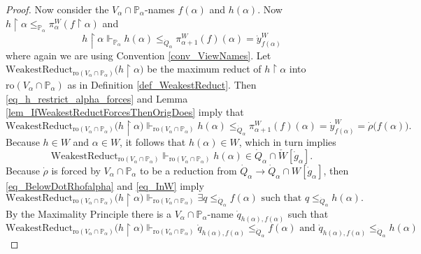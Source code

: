 \documentclass{amsart}
\begin{document}
\begin{proof}
Now consider the $V_\alpha \cap \mathbb{P}_\alpha$-names $f(\alpha)$ and $h(\alpha)$.  Now $h \restriction \alpha \le_{\mathbb{P}_\alpha} \pi^W_\alpha(f \restriction \alpha)$ and 
\begin{equation}\label{eq_h_restrict_alpha_forces}
h \restriction \alpha \Vdash_{\mathbb{P}_\alpha} h(\alpha) \le_{\dot{Q}_\alpha} \pi^W_{\alpha+1} (f)  (\alpha) = \dot{y}^W_{f(\alpha)}
\end{equation}
where again we are using Convention \ref{conv_ViewNames}.  Let $\text{WeakestReduct}_{\text{ro}(V_\alpha \cap \mathbb{P}_\alpha)} \big( h \restriction \alpha \big)$ be the maximum reduct of $h \restriction \alpha$ into $\text{ro}(V_\alpha \cap \mathbb{P}_\alpha)$ as in Definition \ref{def_WeakestReduct}.  Then \eqref{eq_h_restrict_alpha_forces} and Lemma \ref{lem_IfWeakestReductForcesThenOrigDoes} imply that
\begin{equation}\label{eq_BelowDotRhofalpha}
\text{WeakestReduct}_{\text{ro}(V_\alpha \cap \mathbb{P}_\alpha)} \big( h \restriction \alpha \big) \Vdash_{\text{ro}(V_\alpha \cap \mathbb{P}_\alpha)} h(\alpha) \le_{\dot{Q}_\alpha} \pi^W_{\alpha+1} (f)  (\alpha) = \dot{y}^W_{f(\alpha)} = \dot{\rho}\big( f(\alpha) \big).
\end{equation}
Because $h \in W$ and $\alpha \in W$, it follows that $h(\alpha) \in W$, which in turn implies 
\begin{equation}\label{eq_InW}
\text{WeakestReduct}_{\text{ro}(V_\alpha \cap \mathbb{P}_\alpha)} \Vdash_{\text{ro}(V_\alpha \cap \mathbb{P}_\alpha)} h(\alpha) \in \dot{Q}_\alpha \cap \check{W}[\dot{g}_\alpha].
\end{equation}
Because $\dot{\rho}$ is forced by $V_\alpha \cap \mathbb{P}_\alpha$ to be a reduction from $\dot{Q}_\alpha \to \dot{Q}_\alpha \cap W[\dot{g}_\alpha]$, then \eqref{eq_BelowDotRhofalpha} and \eqref{eq_InW} imply
\begin{equation}
\text{WeakestReduct}_{\text{ro}(V_\alpha \cap \mathbb{P}_\alpha)} \big( h \restriction \alpha \big) \Vdash_{\text{ro}(V_\alpha \cap \mathbb{P}_\alpha)} \exists q \le_{\dot{Q}_\alpha} f(\alpha) \text{ such that } q \le_{\dot{Q}_\alpha} h(\alpha).
\end{equation}
By the Maximality Principle there is a $V_\alpha \cap \mathbb{P}_\alpha$-name $\dot{q}_{h(\alpha), f(\alpha)}$ such that
\begin{equation}\label{eq_WeakestReductForces}
\text{WeakestReduct}_{\text{ro}(V_\alpha \cap \mathbb{P}_\alpha)} \big( h \restriction \alpha \big) \Vdash_{\text{ro}(V_\alpha \cap \mathbb{P}_\alpha)} \dot{q}_{h(\alpha), f(\alpha)} \le_{\dot{Q}_\alpha} f(\alpha) \text{ and } \dot{q}_{h(\alpha), f(\alpha)} \le_{\dot{Q}_\alpha} h(\alpha)

\end{equation}
\end{proof}
\end{document}
